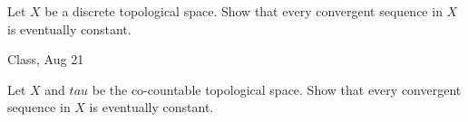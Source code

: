 \begin{samepage}
\begin{ex}
Let $X$ be a discrete topological space. Show that every convergent sequence in $X$ is eventually constant.
\end{ex}
\begin{source}
Class, Aug 21
\end{source}
\end{samepage}

\begin{samepage}
\begin{ex}
Let $X$ and $tau$ be the co-countable topological space. Show that every convergent sequence in $X$ is eventually constant.
\end{ex}
\begin{source}
\end{source}
\end{samepage}
